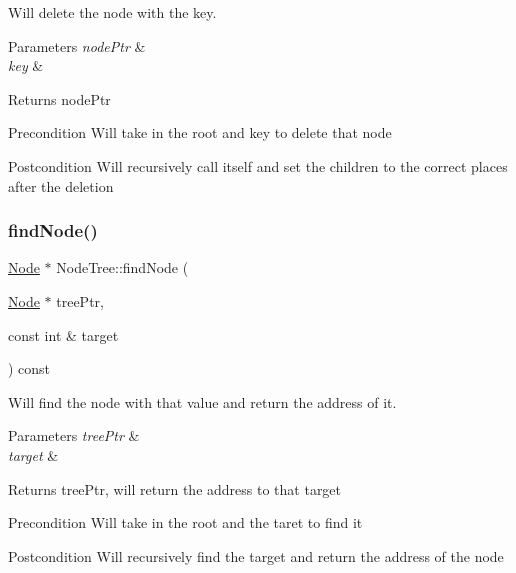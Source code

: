 Will delete the node with the key. 


\begin{DoxyParams}{Parameters}
{\em node\+Ptr} & \\
\hline
{\em key} & \\
\hline
\end{DoxyParams}
\begin{DoxyReturn}{Returns}
node\+Ptr 
\end{DoxyReturn}
\begin{DoxyPrecond}{Precondition}
Will take in the root and key to delete that node 
\end{DoxyPrecond}
\begin{DoxyPostcond}{Postcondition}
Will recursively call itself and set the children to the correct places after the deletion 
\end{DoxyPostcond}
\mbox{\label{class_node_tree_a3f5897a41812b5694c57140eb5ade884}} 
\subsubsection{\texorpdfstring{find\+Node()}{findNode()}}
{\footnotesize\ttfamily \mbox{\hyperlink{class_node}{Node}} $\ast$ Node\+Tree\+::find\+Node (\begin{DoxyParamCaption}\item[{\mbox{\hyperlink{class_node}{Node}} $\ast$}]{tree\+Ptr,  }\item[{const int \&}]{target }\end{DoxyParamCaption}) const\hspace{0.3cm}{\ttfamily [protected]}}



Will find the node with that value and return the address of it. 


\begin{DoxyParams}{Parameters}
{\em tree\+Ptr} & \\
\hline
{\em target} & \\
\hline
\end{DoxyParams}
\begin{DoxyReturn}{Returns}
tree\+Ptr, will return the address to that target 
\end{DoxyReturn}
\begin{DoxyPrecond}{Precondition}
Will take in the root and the taret to find it 
\end{DoxyPrecond}
\begin{DoxyPostcond}{Postcondition}
Will recursively find the target and return the address of the node 
\end{DoxyPostcond}
\mbox{\label{class_node_tree_a28bcd072ea53a04712a792b6b427371c}} 
